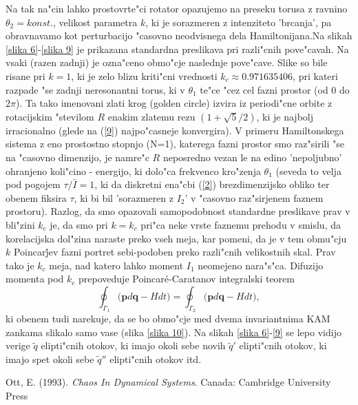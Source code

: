 \documentclass[]{article}
\begin{document}
Na tak na"cin lahko prostovrte"ci rotator opazujemo na preseku torusa z ravnino $\theta_2=konst.$, velikost parametra $k$, ki je sorazmeren z intenziteto 'brcanja', pa obravnavamo kot perturbacijo "casovno neodvisnega dela Hamiltonijana.\newline Na slikah \ref{slika 6}-\ref{slika 9} je prikazana standardna preslikava pri razli"cnih pove"cavah. Na vsaki (razen zadnji) je ozna"ceno obmo"cje naslednje pove"cave. Slike so bile risane pri $k=1$, ki je zelo blizu kriti"cni vrednosti $k_c\approx0.971635406$, pri kateri razpade "se zadnji neresonantni torus, ki v $\theta_1$ te"ce "cez cel fazni prostor (od 0 do $2\pi$). Ta tako imenovani zlati krog (golden circle) izvira iz periodi"cne orbite z rotacijskim "stevilom $R$ enakim zlatemu rezu $(1+\sqrt{5}/2)$, ki je najbolj irracionalno (glede na (\ref{9}) najpo"casneje konvergira). V primeru Hamiltonskega sistema z eno prostostno stopnjo (N=1), katerega fazni prostor smo raz"sirili "se na "casovno dimenzijo, je namre"c $R$ neposredno vezan le na edino 'nepoljubno' ohranjeno koli"cino - energijo, ki dolo"ca frekvenco kro"zenja $\theta_1$ (seveda to velja pod pogojem $\tau/\bar{I}=1$, ki da diskretni ena"cbi (\ref{2}) brezdimenzijsko obliko ter obenem fiksira $\tau$, ki bi bil 'sorazmeren z $I_2$' v "casovno raz"sirjenem faznem prostoru).\newline
Razlog, da smo opazovali samopodobnost standardne preslikave prav v bli"zini $k_c$ je, da smo pri $k=k_c$ pri"ca neke vrste faznemu prehodu v smislu, da korelacijska dol"zina naraste preko vseh meja, kar pomeni, da je v tem obmu"cju $k$ Poincar\'jev fazni portret sebi-podoben preko razli"cnih velikostnih skal. Prav tako je $k_c$ meja, nad katero lahko moment $I_1$ neomejeno nara"s"ca. Difuzijo momenta pod $k_c$ prepoveduje Poincar\'e-Caratanov integralski teorem
\begin{equation}
\oint_{\Gamma_1}\big(\boldsymbol{p}d\boldsymbol{q}-Hdt\big)=\oint_{\Gamma_2}\big(\boldsymbol{p}d\boldsymbol{q}-Hdt\big),
\end{equation}
ki obenem tudi narekuje, da se bo obmo"cje med dvema invariantnima KAM zankama slikalo samo vase (slika \ref{slika 10}). \newline
Na slikah \ref{slika 6}-\ref{9} se lepo vidijo verige $\tilde{q}$ elipti"cnih otokov, ki imajo okoli sebe novih $\tilde{q}'$ elipti"cnih otokov, ki imajo spet okoli sebe $\tilde{q}''$ elipti"cnih otokov itd.
\clearpage
\begin{thebibliography}{9}
	Ott, E. (1993). {\it Chaos In Dynamical Systems}. Canada: Cambridge University Press
\end{thebibliography}
\end{document}
